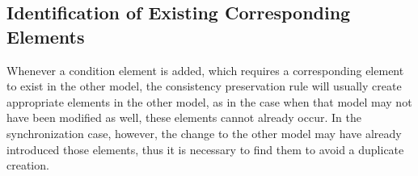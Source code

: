 


\subsection{Identification of Existing Corresponding Elements}
\label{chap:synchronization:achieving:identification}

Whenever a condition element is added, which requires a corresponding element to exist in the other model, the consistency preservation rule will usually create appropriate elements in the other model, as in the case when that model may not have been modified as well, these elements cannot already occur.
In the synchronization case, however, the change to the other model may have already introduced those elements, thus it is necessary to find them to avoid a duplicate creation.

